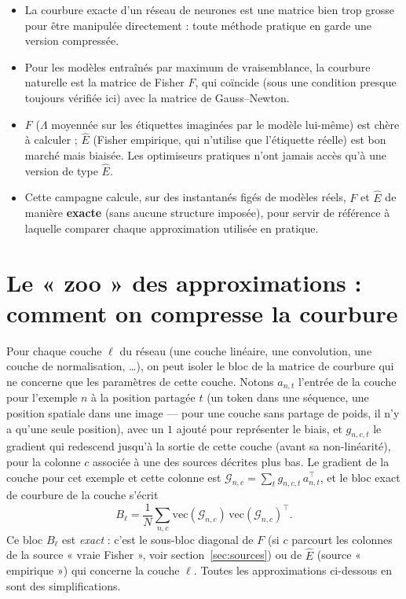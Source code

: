\documentclass[11pt,a4paper]{article}
\begin{document}
\begin{encadre}[À retenir]
\begin{itemize}[leftmargin=1.4em]
\item La courbure exacte d'un réseau de neurones est une matrice bien trop grosse pour être
manipulée directement : toute méthode pratique en garde une version compressée.
\item Pour les modèles entraînés par maximum de vraisemblance, la courbure naturelle est la matrice
de Fisher $F$, qui coïncide (sous une condition presque toujours vérifiée ici) avec la matrice de
Gauss--Newton.
\item $F$ ($\Lambda$ moyennée sur les étiquettes imaginées par le modèle lui-même) est chère à
calculer ; $\hat E$ (Fisher empirique, qui n'utilise que l'étiquette réelle) est bon marché mais
biaisée. Les optimiseurs pratiques n'ont jamais accès qu'à une version de type $\hat E$.
\item Cette campagne calcule, sur des instantanés figés de modèles réels, $F$ et $\hat E$ de manière
\textbf{exacte} (sans aucune structure imposée), pour servir de référence à laquelle comparer chaque
approximation utilisée en pratique.
\end{itemize}
\end{encadre}

\section{Le « zoo » des approximations : comment on compresse la courbure}
\label{sec:zoo}

Pour chaque couche $\ell$ du réseau (une couche linéaire, une convolution, une couche de
normalisation, \dots), on peut isoler le bloc de la matrice de courbure qui ne concerne que les
paramètres de cette couche. Notons $a_{n,t}$ l'entrée de la couche pour l'exemple $n$ à la position
partagée $t$ (un token dans une séquence, une position spatiale dans une image — pour une couche
sans partage de poids, il n'y a qu'une seule position), avec un $1$ ajouté pour représenter le biais,
et $g_{n,c,t}$ le gradient qui redescend jusqu'à la sortie de cette couche (avant sa non-linéarité),
pour la colonne $c$ associée à une des sources décrites plus bas. Le gradient de la couche pour cet
exemple et cette colonne est $\mathcal G_{n,c}=\sum_t g_{n,c,t}\,a_{n,t}^\top$, et le bloc exact de
courbure de la couche s'écrit
\[
B_\ell = \frac1N\sum_{n,c} \mathrm{vec}(\mathcal G_{n,c})\,\mathrm{vec}(\mathcal G_{n,c})^\top .
\]
Ce bloc $B_\ell$ est \emph{exact} : c'est le sous-bloc diagonal de $F$ (si $c$ parcourt les colonnes
de la source « vraie Fisher », voir section~\ref{sec:sources}) ou de $\hat E$ (source « empirique »)
qui concerne la couche $\ell$. Toutes les approximations ci-dessous en sont des simplifications.
\end{document}
